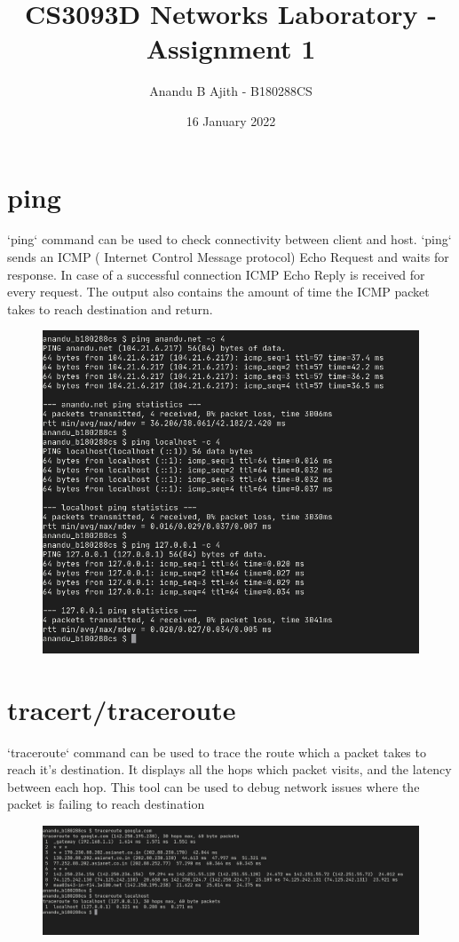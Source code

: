 \documentclass{article}
\title{CS3093D Networks Laboratory  - Assignment 1}
\author{Anandu B Ajith - B180288CS}
\date{16 January 2022}
\begin{document}
% 
% 

\maketitle

\section{ping}
`ping` command can be used to check connectivity between client and host. `ping` sends an ICMP ( Internet Control Message protocol) Echo Request and waits for response. In case of a successful connection ICMP Echo Reply is received for every request. The output also contains the amount of time the ICMP packet takes to reach destination and return.

\begin{figure}[ht]
    \centering
    \includegraphics[width=1.0\textwidth]{images/ping.png}
\end{figure}
\pagebreak
\section{tracert/traceroute}

`traceroute` command can be used to trace the route which a packet takes to reach it's destination. It displays all the hops which packet visits, and the latency between each hop. This tool can be used to debug network issues where the packet is failing to reach destination
\begin{figure}[ht]
    \centering
    \includegraphics[width=1.0\textwidth]{images/traceroute.png}
\end{figure}
\end{document}
